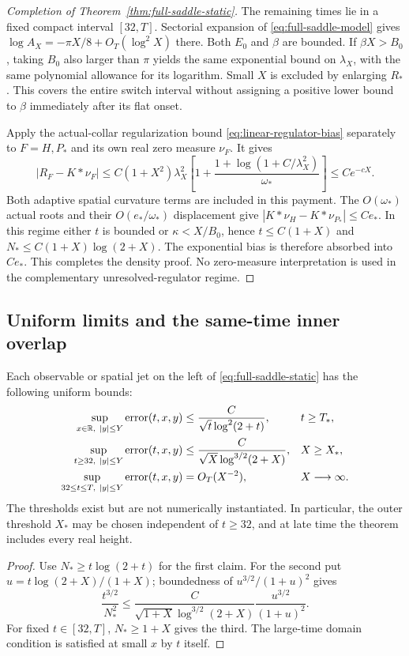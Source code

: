 \begin{proof}[Completion of Theorem~\ref{thm:full-saddle-static}]
The remaining times lie in a fixed compact interval $[32,T]$.
Sectorial expansion of \eqref{eq:full-saddle-model} gives
$\log A_X=-\pi X/8+O_T(\log^2X)$ there. Both $E_0$ and $\beta$ are
bounded. If $\beta X>B_0$, taking $B_0$ also larger than $\pi$ yields
the same exponential bound on $\lambda_X$, with the same polynomial
allowance for its logarithm. Small $X$ is excluded by enlarging $R_*$.
This covers the entire switch interval without assigning a positive
lower bound to $\beta$ immediately after its flat onset.

Apply the actual-collar regularization bound
\eqref{eq:linear-regulator-bias} separately to $F=H,P_*$ and its own
real zero measure $\nu_F$. It gives
\begin{equation}
 |R_F-K*\nu_F|\le C(1+X^2)\lambda_X^2
 \left[1+\frac{1+\log(1+C/\lambda_X^2)}{\omega_*}\right]
 \le Ce^{-cX}.
 \label{eq:full-saddle-regulator-bias}
\end{equation}
Both adaptive spatial curvature terms are included in this payment.
The $O(\omega_*)$ actual roots and their $O(e_*/\omega_*)$
displacement give $|K*\nu_H-K*\nu_{P_*}|\le Ce_*$.
In this regime either $t$ is bounded or $\kappa<X/B_0$, hence
$t\le C(1+X)$ and $N_*\le C(1+X)\log(2+X)$.
The exponential bias is therefore absorbed into $Ce_*$.
This completes the density proof. No zero-measure interpretation is
used in the complementary unresolved-regulator regime.
\end{proof}

\subsection{Uniform limits and the same-time inner overlap}
\begin{corollary}\label{cor:full-saddle-limits}
Each observable or spatial jet on the left of
\eqref{eq:full-saddle-static} has the following uniform bounds:
\begin{align}
 \sup_{x\in\mathbb R,\ |y|\le Y}\text{error}(t,x,y)
 &\le\frac C{\sqrt t\log^2(2+t)},&&t\ge T_*,
 \label{eq:full-saddle-time-limit}\\
 \sup_{t\ge32,\ |y|\le Y}\text{error}(t,x,y)
 &\le\frac C{\sqrt X\log^{3/2}(2+X)},&&X\ge X_*,
 \label{eq:full-saddle-height-limit}\\
 \sup_{32\le t\le T,\ |y|\le Y}\text{error}(t,x,y)
 &=O_T(X^{-2}),&&X\longrightarrow\infty.
 \label{eq:full-saddle-compact-limit}
\end{align}
The thresholds exist but are not numerically instantiated. In particular,
the outer threshold $X_*$ may be chosen independent of $t\ge32$,
and at late time the theorem includes every real height.
\end{corollary}
\begin{proof}
Use $N_*\ge t\log(2+t)$ for the first claim. For the second put
$u=t\log(2+X)/(1+X)$; boundedness of $u^{3/2}/(1+u)^2$ gives
\[
 \frac{t^{3/2}}{N_*^2}
 \le\frac{C}{\sqrt{1+X}\log^{3/2}(2+X)}
       \frac{u^{3/2}}{(1+u)^2}.
\]
For fixed $t\in[32,T]$, $N_*\ge1+X$ gives the third.
The large-time domain condition is satisfied at small $x$ by $t$ itself.
\end{proof}

